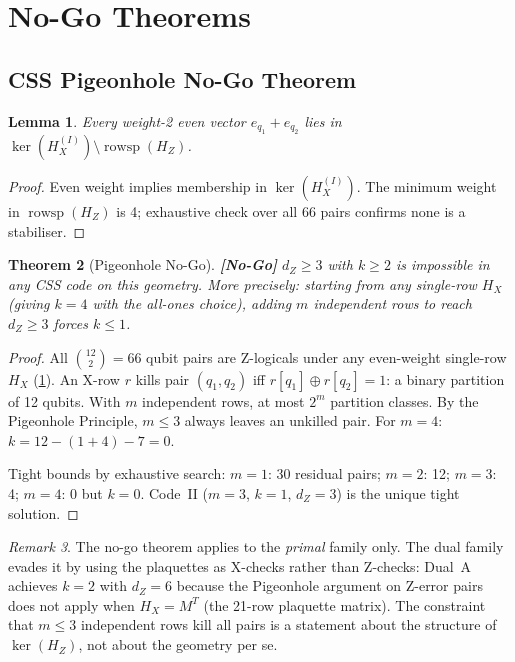 \documentclass[12pt,a4paper]{article}
\theoremstyle{plain}
\newtheorem{theorem}{Theorem}[section]
\newtheorem{lemma}[theorem]{Lemma}
\theoremstyle{definition}
\theoremstyle{remark}
\newtheorem{remark}[theorem]{Remark}
\newcommand{\HZ}{H_Z}
\newcommand{\rowsp}{\operatorname{rowsp}}
\newcommand{\NOGO}{\textcolor{nogocolor}{\textbf{[No-Go]}}}
\begin{document}
\section{No-Go Theorems}\label{sec:nogo}

\subsection{CSS Pigeonhole No-Go Theorem}

\begin{lemma}\label{lem:allpairs}
Every weight-2 even vector $e_{q_1} + e_{q_2}$ lies in
$\ker(H_X^{(I)}) \setminus \rowsp(\HZ)$.
\end{lemma}
\begin{proof}
Even weight implies membership in $\ker(H_X^{(I)})$.
The minimum weight in $\rowsp(\HZ)$ is 4; exhaustive check over all
66 pairs confirms none is a stabiliser.
\end{proof}

\begin{theorem}[Pigeonhole No-Go]\label{thm:nogo}
\NOGO\;
$d_Z \geq 3$ with $k \geq 2$ is impossible in any CSS code on this
geometry.
More precisely: starting from any single-row $H_X$ (giving $k=4$ with
the all-ones choice), adding $m$ independent rows to reach $d_Z \geq 3$
forces $k \leq 1$.
\end{theorem}
\begin{proof}
All $\binom{12}{2}=66$ qubit pairs are Z-logicals under any even-weight
single-row $H_X$ (\cref{lem:allpairs}).
An X-row $r$ kills pair $(q_1,q_2)$ iff $r[q_1]\oplus r[q_2]=1$:
a binary partition of 12 qubits.
With $m$ independent rows, at most $2^m$ partition classes.
By the Pigeonhole Principle, $m \leq 3$ always leaves an unkilled pair.
For $m=4$: $k = 12-(1+4)-7=0$.

Tight bounds by exhaustive search:
$m=1$: 30 residual pairs; $m=2$: 12; $m=3$: 4; $m=4$: 0 but $k=0$.
Code~II ($m=3$, $k=1$, $d_Z=3$) is the unique tight solution.
\end{proof}

\begin{remark}
The no-go theorem applies to the \emph{primal} family only.
The dual family evades it by using the plaquettes as X-checks
rather than Z-checks: Dual~A achieves $k=2$ with $d_Z=6$ because
the Pigeonhole argument on Z-error pairs does not apply when
$H_X = M^T$ (the 21-row plaquette matrix).
The constraint that $m \leq 3$ independent rows kill all pairs
is a statement about the structure of $\ker(\HZ)$, not about the
geometry per se.
\end{remark}
\end{document}
